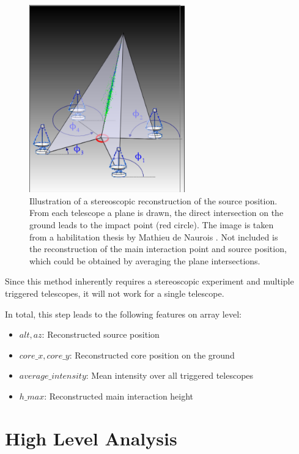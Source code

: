 \begin{figure}
	\centering
	\includegraphics[width=0.6\textwidth]{images/hillas_reco.png}
	\caption{Illustration of a stereoscopic reconstruction of the source position.
    From each telescope a plane is drawn, the direct intersection 
    on the ground leads to the impact point (red circle).
    The image is taken from a habilitation thesis by 
    Mathieu de Naurois \cite{hillas_reco}.
    Not included is the reconstruction of the main interaction point
    and source position, which could be obtained by averaging the plane
    intersections.}
	\label{fig:hillas_reconstructor}
\end{figure}

Since this method inherently requires a stereoscopic experiment
and multiple triggered telescopes, it will not work for a single telescope.

In total, this step leads to the following features on array level:
\begin{itemize}
    \item{$alt, az$: Reconstructed source position}
    \item{$core\_x, core\_y$: Reconstructed core position on the ground}
    \item{$average\_intensity$: Mean intensity over all triggered telescopes}
    \item{$h\_max$: Reconstructed main interaction height}
\end{itemize}

\section{High Level Analysis}

